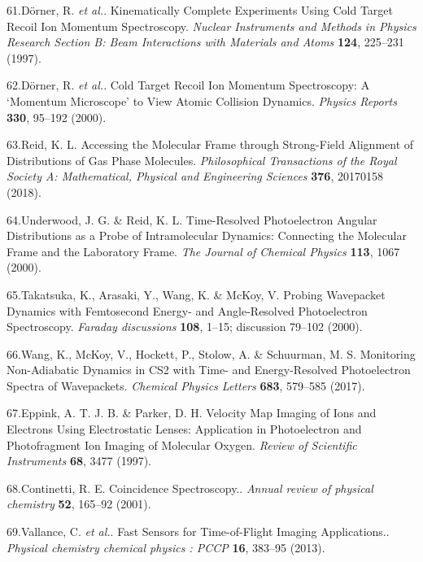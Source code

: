 \documentclass[10pt]{article}
\begin{document}
\label{csl:61}61.D{\"o}rner, R. \textit{et al.}. {Kinematically Complete Experiments Using Cold Target Recoil Ion Momentum Spectroscopy}. \textit{Nuclear Instruments and Methods in Physics Research Section B: Beam Interactions with Materials and Atoms} \textbf{124}, 225–231 (1997).

\label{csl:62}62.D{\"o}rner, R. \textit{et al.}. {Cold {{Target Recoil Ion Momentum Spectroscopy}}: A `Momentum Microscope' to View Atomic Collision Dynamics}. \textit{Physics Reports} \textbf{330}, 95–192 (2000).

\label{csl:63}63.Reid, K. L. {Accessing the Molecular Frame through Strong-Field Alignment of Distributions of Gas Phase Molecules}. \textit{Philosophical Transactions of the Royal Society A: Mathematical, Physical and Engineering Sciences} \textbf{376}, 20170158 (2018).

\label{csl:64}64.Underwood, J. G. \& Reid, K. L. {Time-Resolved Photoelectron Angular Distributions as a Probe of Intramolecular Dynamics: {{Connecting}} the Molecular Frame and the Laboratory Frame}. \textit{The Journal of Chemical Physics} \textbf{113}, 1067 (2000).

\label{csl:65}65.Takatsuka, K., Arasaki, Y., Wang, K. \& McKoy, V. {Probing Wavepacket Dynamics with Femtosecond Energy- and Angle-Resolved Photoelectron Spectroscopy}. \textit{Faraday discussions} \textbf{108}, 1–15; discussion 79–102 (2000).

\label{csl:66}66.Wang, K., McKoy, V., Hockett, P., Stolow, A. \& Schuurman, M. S. {Monitoring Non-Adiabatic Dynamics in {{CS2}} with Time- and Energy-Resolved Photoelectron Spectra of Wavepackets}. \textit{Chemical Physics Letters} \textbf{683}, 579–585 (2017).

\label{csl:67}67.Eppink, A. T. J. B. \& Parker, D. H. {Velocity Map Imaging of Ions and Electrons Using Electrostatic Lenses: {{Application}} in Photoelectron and Photofragment Ion Imaging of Molecular Oxygen}. \textit{Review of Scientific Instruments} \textbf{68}, 3477 (1997).

\label{csl:68}68.Continetti, R. E. {Coincidence Spectroscopy.}. \textit{Annual review of physical chemistry} \textbf{52}, 165–92 (2001).

\label{csl:69}69.Vallance, C. \textit{et al.}. {Fast Sensors for Time-of-Flight Imaging Applications.}. \textit{Physical chemistry chemical physics : PCCP} \textbf{16}, 383–95 (2013).
\end{document}
